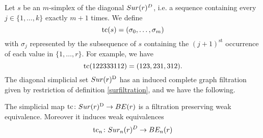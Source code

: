 
Let $s$ be an $m$-simplex of the diagonal $Sur(r)^D$, i.e. a sequence containing every $j \in \{1,\dots,k\}$ exactly $m+1$ times.
We define
\[
\operatorname{tc}(s) = (\sigma_0,\dots,\sigma_m)
\]
with $\sigma_j$ represented by the subsequence of $s$ containing the $(j+1)^{\mathrm{st}}$ occurrence of each value in $\{1,\dots,r\}$.
For example, we have
\[
\operatorname{tc}(122333112) = (123,231,312).
\]
The diagonal simplicial set $Sur(r)^{\mathrm{D}}$ has an induced complete graph filtration given by restriction of definition \ref{surfiltration}, and we have the following.

\begin{theorem}
	The simplicial map $\operatorname{tc} \colon Sur(r)^{\mathrm{D}} \to BE(r)$ is a filtration preserving weak equivalence. Moreover it induces weak equivalences $$\operatorname{tc}_{n} \colon Sur_{n}(r)^{D}\rightarrow BE_{n}(r)$$
\end{theorem}


